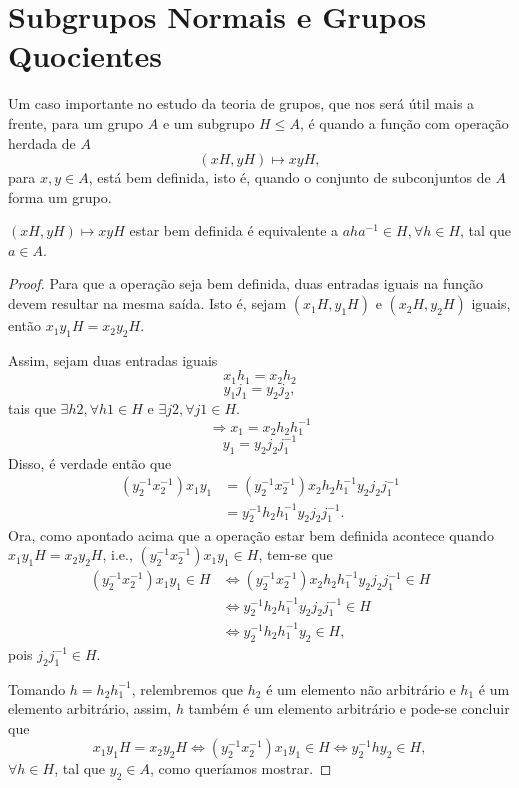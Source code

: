 \documentclass[11pt,openany]{book}
\begin{document}
\chapter{Subgrupos Normais e Grupos Quocientes}

Um caso importante no estudo da teoria de grupos, que nos será útil mais a frente, para um grupo $A$ e um subgrupo $H \leq A$, é quando a função com operação herdada de $A$
\begin{equation}
    (xH, yH) \mapsto xyH,
\end{equation}
para $x, y \in A$, está bem definida, isto é, quando o conjunto de subconjuntos de $A$ forma um grupo.

\begin{proposition}
\label{prop:boa_def_normalidade}
    $(xH, yH) \mapsto xyH$ estar bem definida é equivalente a $aha^{-1} \in H, \forall h \in H$, tal que $a \in A$.
\end{proposition}

\begin{proof}
    Para que a operação seja bem definida, duas entradas iguais na função devem resultar na mesma saída.
    Isto é, sejam $(x_1H,y_1H)$ e $(x_2H,y_2H)$ iguais, então $x_1y_1H = x_2y_2H$.

    Assim, sejam duas entradas iguais
    \[x_1h_1 = x_2h_2\]
    \[y_1j_1 = y_2j_2,\]
    tais que $\exists h2, \forall h1 \in H$ e $\exists j2, \forall j1 \in H$.
    \[\Rightarrow x_1 = x_2h_2h_1^{-1}\]
    \[y_1 = y_2j_2j_1^{-1}\]
    Disso, é verdade então que
    \begin{align*}(y_2^{-1}x_2^{-1})x_1y_1 &= (y_2^{-1}x_2^{-1})x_2h_2h_1^{-1}y_2j_2j_1^{-1}\\
    &= y_2^{-1}h_2h_1^{-1}y_2j_2j_1^{-1}.
    \end{align*}
    Ora, como apontado acima que a operação estar bem definida acontece quando $x_1y_1H = x_2y_2H$, i.e., $(y_2^{-1}x_2^{-1})x_1y_1 \in H$, tem-se que
    \begin{align*}(y_2^{-1}x_2^{-1})x_1y_1 \in H &\Leftrightarrow (y_2^{-1}x_2^{-1})x_2h_2h_1^{-1}y_2j_2j_1^{-1} \in H\\
    &\Leftrightarrow y_2^{-1}h_2h_1^{-1}y_2j_2j_1^{-1} \in H\\
    &\Leftrightarrow y_2^{-1}h_2h_1^{-1}y_2 \in H,
    \end{align*}
    pois $j_2j_1^{-1} \in H$.

    Tomando $h = h_2h_1^{-1}$, relembremos que $h_2$ é um elemento não arbitrário e $h_1$ é um elemento arbitrário, assim, $h$ também é um elemento arbitrário e pode-se concluir que
    \begin{equation}
    \label{eq:normal_subgroup}
        x_1y_1H = x_2y_2H \Leftrightarrow (y_2^{-1}x_2^{-1})x_1y_1 \in H \Leftrightarrow y_2^{-1}hy_2 \in H,
    \end{equation}
    $\forall h \in H$, tal que $y_2 \in A$, como queríamos mostrar.
\end{proof}
\end{document}
